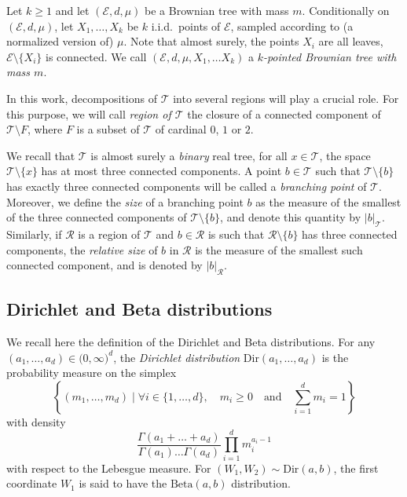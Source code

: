 \documentclass[JEP,XML,SOM,Unicode,NoFloatCountersInSection,published]{cedram}
\let\backslash\setminus
\newcommand{\intervalle}[4]{\mathopen{#1}#2\mathclose{}\mathpunct{},#3\mathclose{#4}}
\newcommand{\intervalleoo}[2]{\intervalle{(}{#1}{#2}{)}}
\newcommand{\Tt}{\mathcal{T}}
\newcommand{\Rr}{\mathcal{R}}
\newcommand{\Dir}{\mathrm{Dir}}
\theoremstyle{plain}
\theoremstyle{definition}
\begin{document}
Let $k \geq 1$ and let $(\mathcal{E},d,\mu)$ be a Brownian tree with mass $m$. Conditionally on $(\mathcal{E},d,\mu)$, let $X_1, \dots, X_k$ be $k$ i.i.d.\ points of $\mathcal{E}$, sampled according to (a normalized version of) $\mu$. Note that almost surely, the points $X_i$ are all leaves, \ie $\mathcal{E} \backslash \{X_i\}$ is connected. We call $(\mathcal{E},d,\mu,X_1,\dots X_k)$ a \emph{$k$-pointed Brownian tree with mass $m$}.

In this work, decompositions of $\Tt$ into several regions will play a crucial role. For this purpose, we will call \emph{region of $\Tt$} the closure of a connected component of $\Tt \backslash F$, where $F$ is a subset of $\Tt$ of cardinal $0$, $1$ or $2$.

We recall that $\Tt$ is almost surely a \emph{binary} real tree, \ie for all $x \in \Tt$, the space $\Tt \backslash \{x\}$ has at most three connected components. A point $b \in \Tt$ such that $\Tt \backslash \{ b \}$ has exactly three connected components will be called a \emph{branching point} of $\Tt$. Moreover, we define the \emph{size} of a branching point $b$ as the measure of the smallest of the three connected components of $\Tt \backslash \{b\}$, and denote this quantity by $|b|_{\Tt}$.
Similarly, if $\Rr$ is a region of $\Tt$ and $b \in \Rr$ is such that $\Rr \backslash \{b\}$ has three connected components, the \emph{relative size} of $b$ in $\Rr$ is the measure of the smallest such connected component, and is denoted by $|b|_{\Rr}$.
\subsection{Dirichlet and Beta distributions}
We recall here the definition of the Dirichlet and Beta distributions.
For any $(a_1,\dots, a_d)\in \intervalleoo{0}{\infty}^d$, the \emph{Dirichlet distribution} $\Dir \left(a_1, \dots, a_d\right)$ is the probability measure on the simplex\vspace*{-3pt}\enlargethispage{.5\baselineskip}
\[\textstyle \left\{ (m_1, \dots, m_{d}) \mid \forall i\in\{1,\dots,d\}, \quad m_i \geq 0 \quad \text{and} \quad \sum_{i=1}^{d} m_i=1 \right\}\]
with density\vspace*{-3pt}
\[ \frac{\Gamma(a_1+\dots + a_d)}{\Gamma(a_1)\dots \Gamma(a_d)} \prod_{i=1}^{d} m_i^{a_i-1} \]
with respect to the Lebesgue measure.
For $(W_1,W_2)\sim \Dir\left(a,b\right)$, the first coordinate $W_1$ is said to have the $\mathrm{Beta}(a,b)$ distribution.
\end{document}
